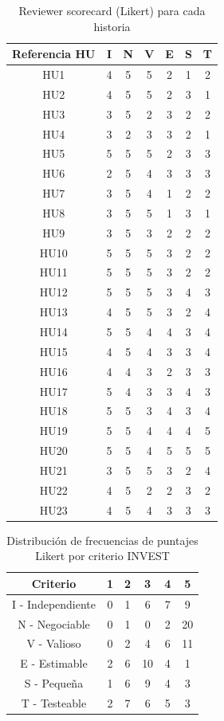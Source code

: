 \begin{table}[h!]
\centering
\begin{tabular}{|c|c|c|c|c|c|c|}
\hline
\textbf{Referencia HU} & \textbf{I} & \textbf{N} & \textbf{V} & \textbf{E} & \textbf{S} & \textbf{T} \\
\hline
HU1 & 4 & 5 & 5 & 2 & 1 & 2 \\
\hline
HU2 & 4 & 5 & 5 & 2 & 3 & 1 \\
\hline
HU3 & 3 & 5 & 2 & 3 & 2 & 2 \\
\hline
HU4 & 3 & 2 & 3 & 3 & 2 & 1 \\
\hline
HU5 & 5 & 5 & 5 & 2 & 3 & 3 \\
\hline
HU6 & 2 & 5 & 4 & 3 & 3 & 3 \\
\hline
HU7 & 3 & 5 & 4 & 1 & 2 & 2 \\
\hline
HU8 & 3 & 5 & 5 & 1 & 3 & 1 \\
\hline
HU9 & 3 & 5 & 3 & 2 & 2 & 2 \\
\hline
HU10 & 5 & 5 & 5 & 3 & 2 & 2 \\
\hline
HU11 & 5 & 5 & 5 & 3 & 2 & 2 \\
\hline
HU12 & 5 & 5 & 5 & 3 & 4 & 3 \\
\hline
HU13 & 4 & 5 & 5 & 3 & 2 & 4 \\
\hline
HU14 & 5 & 5 & 4 & 4 & 3 & 4 \\
\hline
HU15 & 4 & 5 & 4 & 3 & 3 & 4 \\
\hline
HU16 & 4 & 4 & 3 & 2 & 3 & 3 \\
\hline
HU17 & 5 & 4 & 3 & 3 & 4 & 3 \\
\hline
HU18 & 5 & 5 & 3 & 4 & 3 & 4 \\
\hline
HU19 & 5 & 5 & 4 & 4 & 4 & 5 \\
\hline
HU20 & 5 & 5 & 4 & 5 & 5 & 5 \\
\hline
HU21 & 3 & 5 & 5 & 3 & 2 & 4 \\
\hline
HU22 & 4 & 5 & 2 & 2 & 3 & 2 \\
\hline
HU23 & 4 & 5 & 4 & 3 & 3 & 3 \\
\hline
\end{tabular}
\caption{Reviewer scorecard (Likert) para cada historia}
\end{table}

\begin{table}[h!]
\centering
\begin{tabular}{|c|c|c|c|c|c|}
\hline
\textbf{Criterio} & 1 & 2 & 3 & 4 & 5 \\
\hline
I - Independiente & 0 & 1 & 6 & 7 & 9 \\
\hline
N - Negociable & 0 & 1 & 0 & 2 & 20 \\
\hline
V - Valioso & 0 & 2 & 4 & 6 & 11 \\
\hline
E - Estimable & 2 & 6 & 10 & 4 & 1 \\
\hline
S - Pequeña & 1 & 6 & 9 & 4 & 3 \\
\hline
T - Testeable & 2 & 7 & 6 & 5 & 3 \\
\hline
\end{tabular}
\caption{Distribución de frecuencias de puntajes Likert por criterio INVEST}
\end{table}


